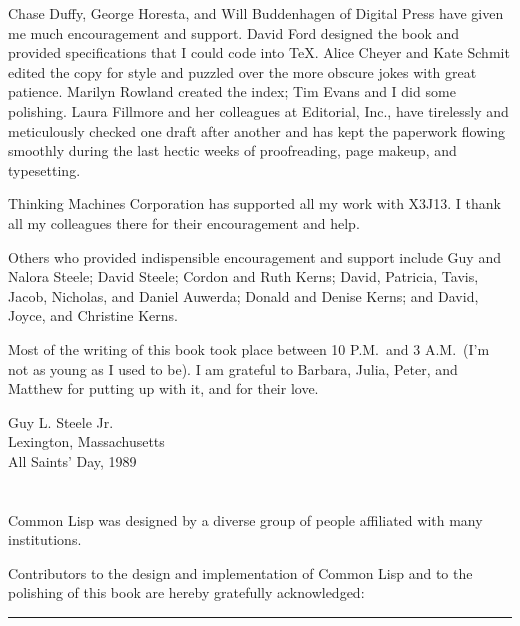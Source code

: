 Chase Duffy, George Horesta, and Will Buddenhagen of Digital Press have given me
much encouragement and support.  David Ford designed the book and
provided specifications that I could code into \TeX.
Alice Cheyer and Kate Schmit edited the copy for style
and puzzled over the more obscure jokes with great patience.
Marilyn Rowland created the index; Tim Evans and I did some polishing.
Laura Fillmore and her colleagues at Editorial, Inc., have
tirelessly and meticulously checked one draft after another and
has kept the paperwork flowing smoothly during the last hectic weeks
of proofreading, page makeup, and typesetting.

Thinking Machines Corporation has supported all my work with X3J13.
I thank all my colleagues there for their encouragement and help.

Others who provided indispensible encouragement and support include
Guy and Nalora Steele; David Steele; Cordon and Ruth Kerns;
David, Patricia, Tavis, Jacob, Nicholas, and Daniel Auwerda;
Donald and Denise Kerns; and David, Joyce, and Christine Kerns.

Most of the writing of this book took place between
10 P.M.~and 3 A.M.~(I'm not as young as I used to be).
I am grateful to Barbara,
Julia, Peter, and Matthew for putting up with it, and for their love.

\begin{tabbing}
Guy L. Steele Jr. \\
Lexington, Massachusetts \\
All Saints' Day, 1989
\end{tabbing}


\chapter*{}

Common Lisp was designed
by a diverse group of people affiliated with many institutions.


Contributors to the
design and implementation of Common Lisp and to the polishing of this book
are hereby gratefully acknowledged:
\hrule width 0pt\relax


